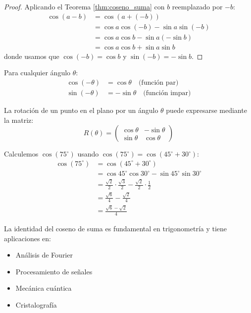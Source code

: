 \begin{proof}
Aplicando el Teorema \ref{thm:coseno_suma} con $b$ reemplazado por $-b$:
\begin{align}
\cos(a - b) &= \cos(a + (-b)) \\
&= \cos a \cos(-b) - \sin a \sin(-b) \\
&= \cos a \cos b - \sin a (-\sin b) \\
&= \cos a \cos b + \sin a \sin b
\end{align}
donde usamos que $\cos(-b) = \cos b$ y $\sin(-b) = -\sin b$.
\end{proof}

\begin{lemma}\label{lemma:paridad}
Para cualquier ángulo $\theta$:
\begin{align}
\cos(-\theta) &= \cos \theta \quad \text{(función par)} \\
\sin(-\theta) &= -\sin \theta \quad \text{(función impar)}
\end{align}
\end{lemma}

\begin{proposition}
La rotación de un punto en el plano por un ángulo $\theta$ puede expresarse mediante la matriz:
\begin{equation}\label{eq:matriz_rotacion_prop}
R(\theta) = \begin{pmatrix}
\cos \theta & -\sin \theta \\
\sin \theta & \cos \theta
\end{pmatrix}
\end{equation}
\end{proposition}

\begin{example}
Calculemos $\cos(75^\circ)$ usando $\cos(75^\circ) = \cos(45^\circ + 30^\circ)$:
\begin{align}
\cos(75^\circ) &= \cos(45^\circ + 30^\circ) \\
&= \cos 45^\circ \cos 30^\circ - \sin 45^\circ \sin 30^\circ \\
&= \frac{\sqrt{2}}{2} \cdot \frac{\sqrt{3}}{2} - \frac{\sqrt{2}}{2} \cdot \frac{1}{2} \\
&= \frac{\sqrt{6}}{4} - \frac{\sqrt{2}}{4} \\
&= \frac{\sqrt{6} - \sqrt{2}}{4}
\end{align}
\end{example}

\begin{remark}
La identidad del coseno de suma es fundamental en trigonometría y tiene aplicaciones en:
\begin{itemize}
\item Análisis de Fourier
\item Procesamiento de señales
\item Mecánica cuántica
\item Cristalografía
\end{itemize}
\end{remark}

